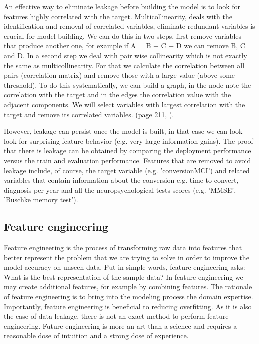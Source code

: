 \documentclass[11pt]{article}
\theoremstyle{definition}
\theoremstyle{remark}
\begin{document}
An effective way to eliminate leakage before building the model is to look for features highly correlated with the target. Multicollinearity, deals with the identification and removal of correlated variables, eliminate redundant variables is crucial for model building. We can do this in two steps, first remove variables that produce another one, for example if A = B + C + D we can remove B, C and D. 
In a second step we deal with pair wise collinearity which is not exactly the same as multicollinearity. For that we calculate the correlation between all pairs (correlation matrix) and remove those with a large value (above some threshold). To do this systematically, we can build a graph, in the node note the correlation with the target and in the edges the correlation value with the adjacent components. We will select variables with largest correlation with the target and remove its correlated variables. (page 211, \cite{wu2012foundations}).


However, leakage can persist once the model is built, in that case we can look look for surprising feature behavior (e.g. very large information gains). The proof that there is leakage can be obtained by comparing the deployment performance versus the train and evaluation performance. Features that are removed to avoid leakage include, of course, the target variable (e.g. 'conversionMCI') and related variables that contain information about the conversion e.g. time to convert, diagnosis per year and all the neuropsychological tests scores (e.g. 'MMSE', 'Buschke memory test').

\subsection{Feature engineering}
\label{sse:fe}
Feature engineering is the process of transforming raw data into features that better represent the problem that we are trying to solve in order to improve the model accuracy on unseen data. 
Put in simple words, feature engineering asks: What is the best representation of the sample data?
In feature engineering we may create additional features, for example by combining features. The rationale of feature engineering is to bring into the modeling process the domain expertise. Importantly, feature engineering is beneficial to reducing overfitting. As it is also the case of data leakage, there is not an exact method to perform feature engineering. Future engineering is more an art than a science and requires a reasonable dose of intuition and a strong dose of experience.
\end{document}
